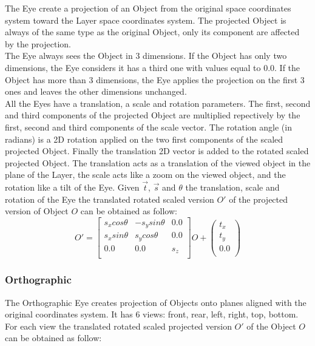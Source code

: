 The Eye create a projection of an Object from the original space coordinates system toward the Layer space coordinates system. The projected Object is always of the same type as the original Object, only its component are affected by the projection.\\

The Eye always sees the Object in 3 dimensions. If the Object has only two dimensions, the Eye considers it has a third one with values equal to 0.0. If the Object has more than 3 dimensions, the Eye applies the projection on the first 3 ones and leaves the other dimensions unchanged.\\

All the Eyes have a translation, a scale and rotation parameters. The first, second and third components of the projected Object are multiplied repectively by the first, second and third components of the scale vector. The rotation angle (in radians) is a 2D rotation applied on the two first components of the scaled projected Object. Finally the translation 2D vector is added to the rotated scaled projected Object. The translation acts as a translation of the viewed object in the plane of the Layer, the scale acts like a zoom on the viewed object, and the rotation like a tilt of the Eye. Given $\overrightarrow{t}$, $\overrightarrow{s}$ and $\theta$ the translation, scale and rotation of the Eye the translated rotated scaled version $O'$ of the projected version of Object $O$ can be obtained as follow:\\

\begin{equation}
O'=\left[
\begin{array}{ccc}
s_xcos\theta&-s_ysin\theta&0.0\\
s_xsin\theta&s_ycos\theta&0.0\\
0.0&0.0&s_z\\
\end{array}\right]O+\left(
\begin{array}{c}
t_x\\
t_y\\
0.0\\
\end{array}\right)
\end{equation}

\subsubsection{Orthographic}

The Orthographic Eye creates projection of Objects onto planes aligned with the original coordinates system. It has 6 views: front, rear, left, right, top, bottom. For each view the translated rotated scaled projected version $O'$ of the Object $O$ can be obtained as follow:\\

